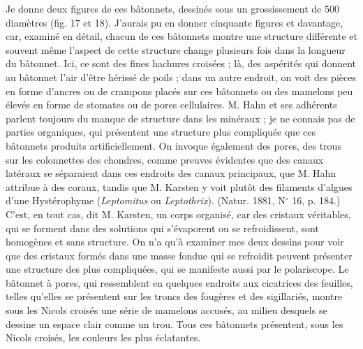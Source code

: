 \documentclass[a4paper, 12pt, oneside, french]{article}
\begin{document}
Je donne deux figures de ces bâtonnets, dessinés sous un grossissement de 500 diamètres (fig. 17 et 18). J'aurais pu en donner cinquante figures et davantage, car, examiné en détail, chacun de ces bâtonnets montre une structure différente et souvent même l'aspect de cette structure change plusieurs fois dans la longueur du bâtonnet. Ici, ce sont des fines hachures croisées ; là, des aspérités qui donnent au bâtonnet l'air d'être hérissé de poils ; dans un autre endroit, on voit des pièces en forme d'ancres ou de crampons placés sur ces bâtonnets ou des mamelons peu élevés en forme de stomates ou de pores cellulaires. M. Hahn et ses adhérents parlent toujours du \og manque de structure \fg dans les minéraux ; je ne connais pas de parties organiques, qui présentent une structure plus compliquée que ces bâtonnets produits artificiellement. On invoque également des pores, des trous sur les colonnettes des chondres, comme preuves évidentes que des canaux latéraux se séparaient dans ces endroits des canaux principaux, que M. Hahn attribue à des coraux, tandis que M. Karsten y voit plutôt des filaments d'algues d'une Hystérophyme (\emph{Leptomitus} ou \emph{Leptothrix}). (Natur. 1881, N$^{\circ}$ 16, p. 184.) \og C'est, en tout cas, dit M. Karsten, un corps organisé, car des cristaux véritables, qui se forment dans des solutions qui s'évaporent ou se refroidissent, sont homogènes et sans structure. \fg On n'a qu'à examiner mes deux dessins pour voir que des cristaux formés dans une masse fondue qui se refroidit peuvent présenter une structure des plus compliquées, qui se manifeste aussi par le polariscope. Le bâtonnet à pores, qui ressemblent en quelques endroits aux cicatrices des feuilles, telles qu'elles se présentent sur les troncs des fougères et des sigillariés, montre sous les Nicols croisés une série de mamelons accusés, au milieu desquels se dessine un espace clair comme un trou. Tous ces bâtonnets présentent, sous les Nicols croisés, les couleurs les plus éclatantes.
\end{document}
